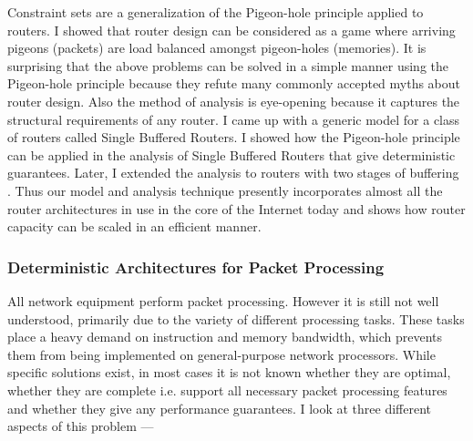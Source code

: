 \documentclass[a4paper, 10pt]{article}
\begin{document}
\begin{small}
Constraint sets are a generalization of the Pigeon-hole principle applied to
routers. I showed that router design can be considered as a game where arriving
pigeons (packets) are load balanced amongst pigeon-holes (memories). 
It is surprising that the above problems can be solved \cite{pps, ppsmcast, dsm} in a simple
manner using the Pigeon-hole principle because they refute many commonly 
accepted myths about router design. 
Also the method of analysis is eye-opening because it captures the structural 
requirements of any router. 
I came up with a generic model for a class of routers called Single Buffered Routers. 
I showed how the Pigeon-hole principle can be applied in the analysis of Single Buffered
Routers that give deterministic guarantees.  Later, I extended the analysis to 
routers with two stages of buffering \cite{csets}. 
Thus our model and analysis technique
presently incorporates almost all the router architectures in use in the
core of the Internet today and shows how router capacity can be scaled in
an efficient manner.


\subsubsection*{\small Deterministic Architectures for Packet Processing}

All network equipment perform packet processing. However 
it is still not well understood, primarily due to the variety of
different processing tasks.
These tasks place a heavy demand on instruction and memory bandwidth, which 
prevents them from being implemented on general-purpose network processors.
While specific solutions exist, in most cases it is not known whether they
are optimal, whether they are complete i.e. support all necessary packet processing features and whether they
give any performance guarantees. I look at three different aspects of this problem ---

 

\end{small}
\end{document}
